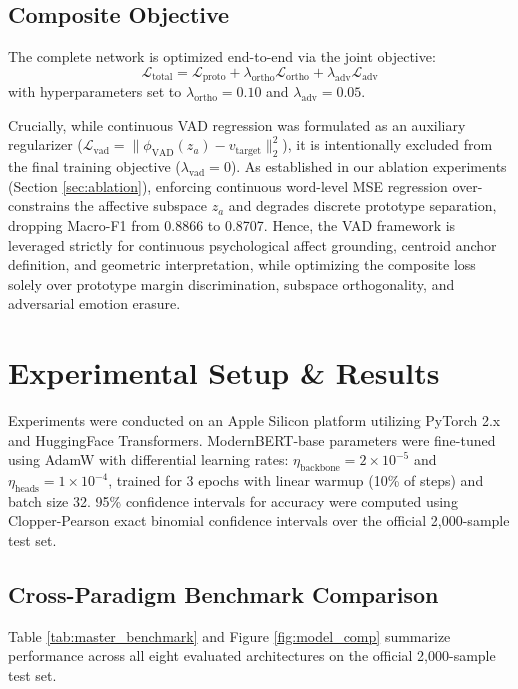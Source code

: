 \documentclass[journal,twocolumn]{article}
\begin{document}
\subsection{Composite Objective}
The complete network is optimized end-to-end via the joint objective:
\begin{equation}
    \mathcal{L}_{\text{total}} = \mathcal{L}_{\text{proto}} + \lambda_{\text{ortho}} \mathcal{L}_{\text{ortho}} + \lambda_{\text{adv}} \mathcal{L}_{\text{adv}}
\end{equation}
with hyperparameters set to $\lambda_{\text{ortho}} = 0.10$ and $\lambda_{\text{adv}} = 0.05$.

Crucially, while continuous VAD regression was formulated as an auxiliary regularizer ($\mathcal{L}_{\text{vad}} = \|\phi_{\text{VAD}}(z_a) - v_{\text{target}}\|_2^2$), it is intentionally excluded from the final training objective ($\lambda_{\text{vad}}=0$). As established in our ablation experiments (Section \ref{sec:ablation}), enforcing continuous word-level MSE regression over-constrains the affective subspace $z_a$ and degrades discrete prototype separation, dropping Macro-F1 from 0.8866 to 0.8707. Hence, the VAD framework is leveraged strictly for continuous psychological affect grounding, centroid anchor definition, and geometric interpretation, while optimizing the composite loss solely over prototype margin discrimination, subspace orthogonality, and adversarial emotion erasure.

\section{Experimental Setup \& Results}
\label{sec:experiments}

Experiments were conducted on an Apple Silicon platform utilizing PyTorch 2.x and HuggingFace Transformers. ModernBERT-base parameters were fine-tuned using AdamW with differential learning rates: $\eta_{\text{backbone}} = 2 \times 10^{-5}$ and $\eta_{\text{heads}} = 1 \times 10^{-4}$, trained for 3 epochs with linear warmup (10\% of steps) and batch size 32. 95\% confidence intervals for accuracy were computed using Clopper-Pearson exact binomial confidence intervals over the official 2,000-sample test set.

\subsection{Cross-Paradigm Benchmark Comparison}
Table \ref{tab:master_benchmark} and Figure \ref{fig:model_comp} summarize performance across all eight evaluated architectures on the official 2,000-sample test set.
\end{document}
